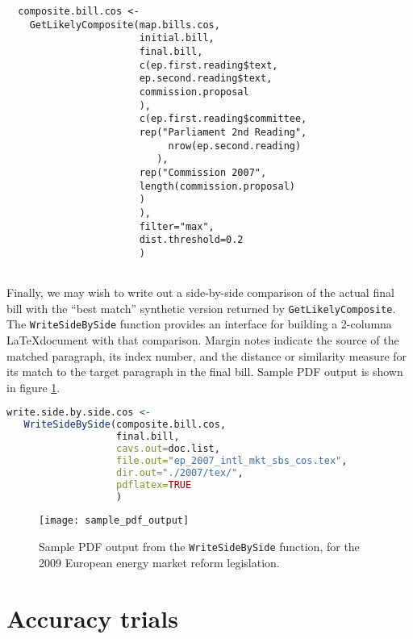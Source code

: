 \documentclass[11pt]{article}
\begin{document}
\begin{lstlisting}
  composite.bill.cos <- 
    GetLikelyComposite(map.bills.cos,
                       initial.bill,
                       final.bill,
                       c(ep.first.reading$text,
                       ep.second.reading$text,
                       commission.proposal
                       ),
                       c(ep.first.reading$committee,
                       rep("Parliament 2nd Reading", 
                            nrow(ep.second.reading)
                          ),
                       rep("Commission 2007",
                       length(commission.proposal)
                       )
                       ),
                       filter="max",
                       dist.threshold=0.2
                       )
                       
\end{lstlisting}

Finally, we may wish to write out a side-by-side comparison of the
actual final bill with the ``best match'' synthetic version returned
by \texttt{GetLikelyComposite}. The 
\texttt{WriteSideBySide} function provides an interface for building a
2-columna \LaTeX document with that comparison. Margin notes indicate the source of the
matched paragraph, its index number, and the distance or similarity
measure for its match to the target paragraph in the final
bill. Sample PDF output is shown in figure \ref{fig:pdf-output}.

\begin{lstlisting}[language=R]
write.side.by.side.cos <- 
   WriteSideBySide(composite.bill.cos,
                   final.bill,
                   cavs.out=doc.list,
                   file.out="ep_2007_intl_mkt_sbs_cos.tex",
                   dir.out="./2007/tex/",
                   pdflatex=TRUE
                   )
\end{lstlisting}

\begin{figure}[ht]
  \centering
  \texttt{[image: sample\_pdf\_output]}
  \label{fig:pdf-output}
  \caption{Sample PDF output from the \texttt{WriteSideBySide} function, for the 2009 European energy market reform legislation.}
\end{figure}

\section{Accuracy trials}
\label{sec:accuracy-trials}
\end{document}
